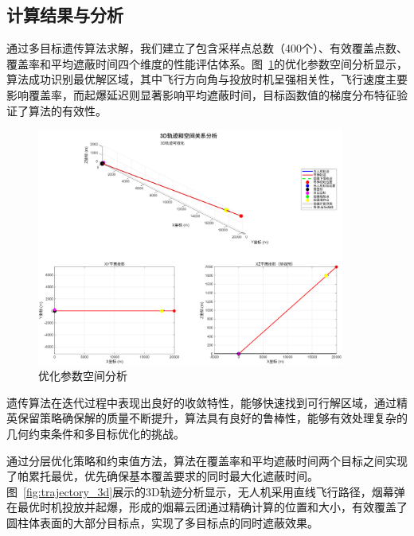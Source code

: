 \subsection{计算结果与分析}

通过多目标遗传算法求解，我们建立了包含采样点总数（400个）、有效覆盖点数、覆盖率和平均遮蔽时间四个维度的性能评估体系。图~\ref{fig:optimization_analysis}的优化参数空间分析显示，算法成功识别最优解区域，其中飞行方向角与投放时机呈强相关性，飞行速度主要影响覆盖率，而起爆延迟则显著影响平均遮蔽时间，目标函数值的梯度分布特征验证了算法的有效性。

\begin{figure}[htbp]
\centering
\includegraphics[width=0.9\textwidth]{figures/A_2_1.png}
\caption{优化参数空间分析}
\label{fig:optimization_analysis}
\end{figure}

遗传算法在迭代过程中表现出良好的收敛特性，能够快速找到可行解区域，通过精英保留策略确保解的质量不断提升，算法具有良好的鲁棒性，能够有效处理复杂的几何约束条件和多目标优化的挑战。

通过分层优化策略和约束值方法，算法在覆盖率和平均遮蔽时间两个目标之间实现了帕累托最优，优先确保基本覆盖要求的同时最大化遮蔽时间。图~\ref{fig:trajectory_3d}展示的3D轨迹分析显示，无人机采用直线飞行路径，烟幕弹在最优时机投放并起爆，形成的烟幕云团通过精确计算的位置和大小，有效覆盖了圆柱体表面的大部分目标点，实现了多目标点的同时遮蔽效果。

